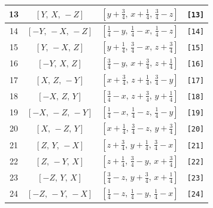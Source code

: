 \documentclass[fleqn,8pt]{jsarticle}
\begin{document}
\begin{longtable}{cccc}
13 & $\left[ Y,\, X,\, - Z \right]$ & $\left[ y + \frac{3}{4},\, x + \frac{1}{4},\, \frac{3}{4} - z \right]$ & {\tt [13]} \\ \hline
14 & $\left[ - Y,\, - X,\, - Z \right]$ & $\left[ \frac{1}{4} - y,\, \frac{1}{4} - x,\, \frac{1}{4} - z \right]$ & {\tt [14]} \\ \hline
15 & $\left[ Y,\, - X,\, Z \right]$ & $\left[ y + \frac{1}{4},\, \frac{3}{4} - x,\, z + \frac{3}{4} \right]$ & {\tt [15]} \\ \hline
16 & $\left[ - Y,\, X,\, Z \right]$ & $\left[ \frac{3}{4} - y,\, x + \frac{3}{4},\, z + \frac{1}{4} \right]$ & {\tt [16]} \\ \hline
17 & $\left[ X,\, Z,\, - Y \right]$ & $\left[ x + \frac{3}{4},\, z + \frac{1}{4},\, \frac{3}{4} - y \right]$ & {\tt [17]} \\ \hline
18 & $\left[ - X,\, Z,\, Y \right]$ & $\left[ \frac{3}{4} - x,\, z + \frac{3}{4},\, y + \frac{1}{4} \right]$ & {\tt [18]} \\ \hline
19 & $\left[ - X,\, - Z,\, - Y \right]$ & $\left[ \frac{1}{4} - x,\, \frac{1}{4} - z,\, \frac{1}{4} - y \right]$ & {\tt [19]} \\ \hline
20 & $\left[ X,\, - Z,\, Y \right]$ & $\left[ x + \frac{1}{4},\, \frac{3}{4} - z,\, y + \frac{3}{4} \right]$ & {\tt [20]} \\ \hline
21 & $\left[ Z,\, Y,\, - X \right]$ & $\left[ z + \frac{3}{4},\, y + \frac{1}{4},\, \frac{3}{4} - x \right]$ & {\tt [21]} \\ \hline
22 & $\left[ Z,\, - Y,\, X \right]$ & $\left[ z + \frac{1}{4},\, \frac{3}{4} - y,\, x + \frac{3}{4} \right]$ & {\tt [22]} \\ \hline
23 & $\left[ - Z,\, Y,\, X \right]$ & $\left[ \frac{3}{4} - z,\, y + \frac{3}{4},\, x + \frac{1}{4} \right]$ & {\tt [23]} \\ \hline
24 & $\left[ - Z,\, - Y,\, - X \right]$ & $\left[ \frac{1}{4} - z,\, \frac{1}{4} - y,\, \frac{1}{4} - x \right]$ & {\tt [24]} \\
\end{longtable}
\end{document}
